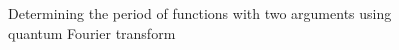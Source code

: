 \begin{figure}
\centering



\caption{Determining the period of functions with two arguments using quantum
  Fourier transform}
\label{figQuantCompQuantPeriodFinding2}
\end{figure}